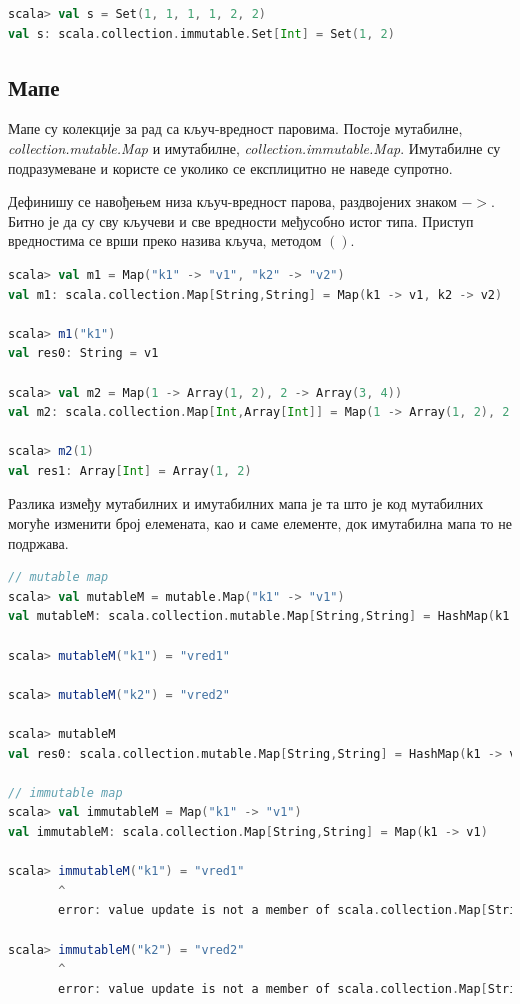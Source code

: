 \documentclass[12pt,oneside]{memoir}
\begin{document}
\begin{lstlisting}[language=Scala, caption={Инстанцирање скупа у Скали}, label={lst:scala_coll_set_example}]
scala> val s = Set(1, 1, 1, 1, 2, 2)
val s: scala.collection.immutable.Set[Int] = Set(1, 2)
\end{lstlisting}

\subsection{Мапе}
\label{subsec:scala_maps}

Мапе су колекције за рад са кључ-вредност паровима. Постоје мутабилне, \textit{collection.mutable.Map} и имутабилне, \textit{collection.immutable.Map}. Имутабилне су подразумеване и користе се уколико се експлицитно не наведе супротно.

Дефинишу се навођењем низа кључ-вредност парова, раздвојених знаком $->$. Битно је да су сву кључеви и све вредности међусобно истог типа. Приступ вредностима се врши преко назива кључа, методом $()$.

\begin{lstlisting}[language=Scala, caption={Мапе у Скали}, label={lst:scala_app_maps_example}]
scala> val m1 = Map("k1" -> "v1", "k2" -> "v2")
val m1: scala.collection.Map[String,String] = Map(k1 -> v1, k2 -> v2)

scala> m1("k1")
val res0: String = v1

scala> val m2 = Map(1 -> Array(1, 2), 2 -> Array(3, 4))
val m2: scala.collection.Map[Int,Array[Int]] = Map(1 -> Array(1, 2), 2 -> Array(3, 4))

scala> m2(1)
val res1: Array[Int] = Array(1, 2)
\end{lstlisting}

Разлика између мутабилних и имутабилних мапа је та што је код мутабилних могуће изменити број елемената, као и саме елементе, док имутабилна мапа то не подржава.

\begin{lstlisting}[language=Scala, caption={Измена и додавање елемента код мутабилних и имутабилних мапа}, label={lst:scala_coll_maps_mutable_immutable}]
// mutable map
scala> val mutableM = mutable.Map("k1" -> "v1")
val mutableM: scala.collection.mutable.Map[String,String] = HashMap(k1 -> v1)

scala> mutableM("k1") = "vred1"

scala> mutableM("k2") = "vred2"

scala> mutableM
val res0: scala.collection.mutable.Map[String,String] = HashMap(k1 -> vred1, k2 -> vred2)

// immutable map
scala> val immutableM = Map("k1" -> "v1")
val immutableM: scala.collection.Map[String,String] = Map(k1 -> v1)

scala> immutableM("k1") = "vred1"
       ^
       error: value update is not a member of scala.collection.Map[String,String]

scala> immutableM("k2") = "vred2"
       ^
       error: value update is not a member of scala.collection.Map[String,String]

\end{lstlisting}
\end{document}
